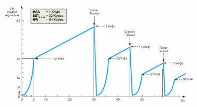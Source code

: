 \begin{itemize}
\begin{enumerate}
    \end{enumerate}
        \begin{figure}[H] \centering
        \includegraphics[width=0.9\textwidth]{img/TCP_congtimeout.png}\end{figure}
\end{itemize}
